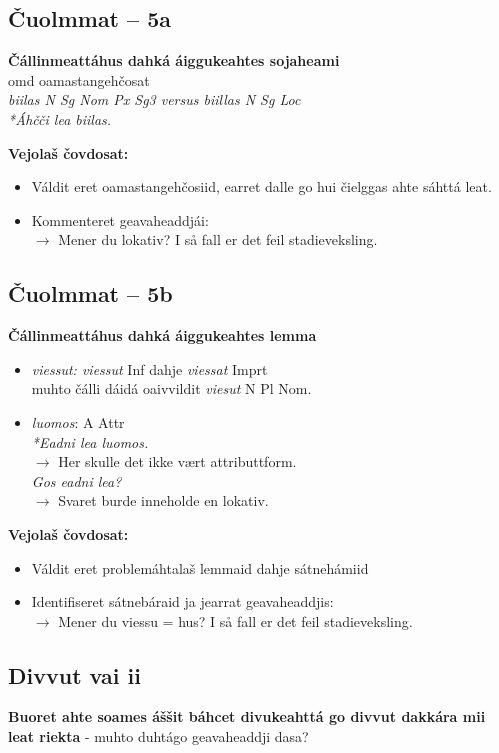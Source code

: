 \documentclass[a4paper,14pt]{article}
\begin{document}
\subsection{Čuolmmat -- 5a}
\textbf{Čállinmeattáhus dahká áiggukeahtes sojaheami} \\
omd oamastangehčosat \\
\textit{biilas N Sg Nom Px Sg3 versus biillas N Sg Loc} \\
\textit{*Áhčči lea biilas.}

\textbf{Vejolaš čovdosat:}
\begin{itemize}
\item Váldit eret oamastangehčosiid, earret dalle go hui čielggas ahte sáhttá leat.
\item Kommenteret geavaheaddjái: \\
$\rightarrow$ Mener du lokativ? I så fall er det feil stadieveksling.
\end{itemize}

\subsection{Čuolmmat -- 5b}
\textbf{Čállinmeattáhus dahká áiggukeahtes lemma} \\
\begin{itemize}
\item \textit{viessut:  viessut} Inf dahje \textit{viessat} Imprt \\
muhto čálli dáidá oaivvildit \textit{viesut} N Pl Nom.   
\item \textit{luomos}: A Attr \\
\textit{*Eadni lea luomos.} \\
$\rightarrow$ Her skulle det ikke vært attributtform. \\  
\textit{Gos eadni lea?} \\ 
$\rightarrow$ Svaret burde inneholde en lokativ.
\end{itemize}

\textbf{Vejolaš čovdosat:}
\begin{itemize}
\item Váldit eret problemáhtalaš lemmaid dahje sátnehámiid
\item Identifiseret sátnebáraid ja jearrat geavaheaddjis: \\ $\rightarrow$ Mener du viessu = hus? I så fall er det feil stadieveksling.
\end{itemize}




\subsection{Divvut vai ii}
\textbf{Buoret ahte soames áššit báhcet divukeahttá go divvut dakkára mii leat riekta}
- muhto duhtágo geavaheaddji dasa?
\end{document}
